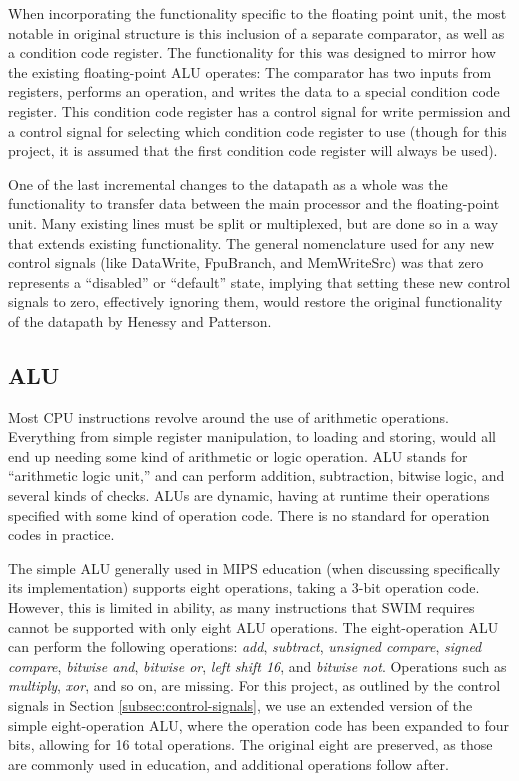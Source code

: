 \documentclass[
    paper=letter,
    parskip=half,
    fontsize=12pt,
    titlepage=firstiscover,
    toc=bibliography,
    numbers=endperiod
]{scrartcl}
\begin{document}
When incorporating the functionality specific to the floating point
unit, the most notable in original structure is this inclusion of a
separate comparator, as well as a condition code register. The
functionality for this was designed to mirror how the existing
floating-point ALU operates: The comparator has two inputs from
registers, performs an operation, and writes the data to a special
condition code register. This condition code register has a control
signal for write permission and a control signal for selecting which
condition code register to use (though for this project, it is assumed
that the first condition code register will always be used).

One of the last incremental changes to the datapath as a whole was the
functionality to transfer data between the main processor and the
floating-point unit. Many existing lines must be split or multiplexed,
but are done so in a way that extends existing functionality. The
general nomenclature used for any new control signals (like DataWrite,
FpuBranch, and MemWriteSrc) was that zero represents a ``disabled'' or
``default'' state, implying that setting these new control signals to
zero, effectively ignoring them, would restore the original
functionality of the datapath by Henessy and Patterson.

\subsection{ALU}

Most CPU instructions revolve around the use of arithmetic operations.
Everything from simple register manipulation, to loading and storing,
would all end up needing some kind of arithmetic or logic operation. ALU
stands for ``arithmetic logic unit,'' and can perform addition,
subtraction, bitwise logic, and several kinds of checks. ALUs are
dynamic, having at runtime their operations specified with some kind of
operation code. There is no standard for operation codes in practice.

The simple ALU generally used in MIPS education (when discussing
specifically its implementation) supports eight operations, taking a
3-bit operation code. However, this is limited in ability, as many
instructions that SWIM requires cannot be supported with only eight ALU
operations. The eight-operation ALU can perform the following
operations: \emph{add}, \emph{subtract}, \emph{unsigned compare},
\emph{signed compare}, \emph{bitwise and}, \emph{bitwise or}, \emph{left
    shift 16}, and \emph{bitwise not}. Operations such as \emph{multiply},
\emph{xor}, and so on, are missing. For this project, as outlined by the
control signals in Section \ref{subsec:control-signals}, we use an
extended version of the simple eight-operation ALU, where the operation
code has been expanded to four bits, allowing for 16 total operations.
The original eight are preserved, as those are commonly used in
education, and additional operations follow after.
\end{document}
